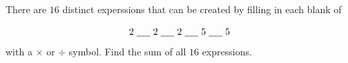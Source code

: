 There are $16$ distinct experssions that can be created by filling in each blank of

$$2\;\underline{\hspace{0.5cm}}\;2\;\underline{\hspace{0.5cm}}\;2\;\underline{\hspace{0.5cm}}\;5\;\underline{\hspace{0.5cm}}\;5$$with a $\times$ or $\div$ symbol. Find the sum of all $16$ expressions.
